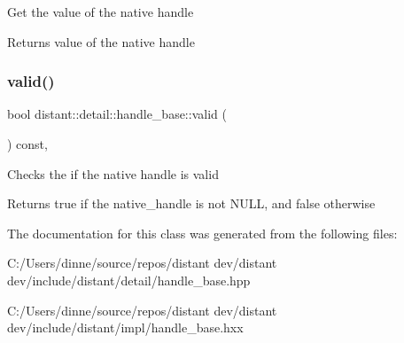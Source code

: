 Get the value of the native handle \begin{DoxyReturn}{Returns}
value of the native handle 
\end{DoxyReturn}
\mbox{\label{classdistant_1_1detail_1_1handle__base_aa138b2e6e919a0199225403558e1b63d}} 
\subsubsection{\texorpdfstring{valid()}{valid()}}
{\footnotesize\ttfamily bool distant\+::detail\+::handle\+\_\+base\+::valid (\begin{DoxyParamCaption}{ }\end{DoxyParamCaption}) const\hspace{0.3cm}{\ttfamily [inline]}, {\ttfamily [noexcept]}}

Checks the if the native handle is valid \begin{DoxyReturn}{Returns}
true if the native\+\_\+handle is not N\+U\+LL, and false otherwise 
\end{DoxyReturn}


The documentation for this class was generated from the following files\+:\begin{DoxyCompactItemize}
\item 
C\+:/\+Users/dinne/source/repos/distant dev/distant dev/include/distant/detail/handle\+\_\+base.\+hpp\item 
C\+:/\+Users/dinne/source/repos/distant dev/distant dev/include/distant/impl/handle\+\_\+base.\+hxx\end{DoxyCompactItemize}
